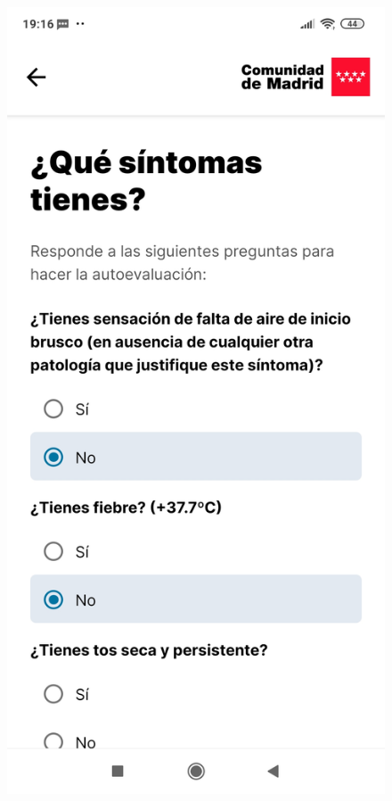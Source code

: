 \documentclass[a4paper, 12pt]{article}
\begin{document}
\begin{figure}[!htb]
\begin{minipage}{0.33\textwidth}
   \end{minipage}\hfill
   \begin{minipage}{0.33\textwidth}
     \centering
     \includegraphics[scale=0.06]{images/discussion/coronamadrid-2.jpg}

\end{minipage}
\end{figure}
\end{document}
